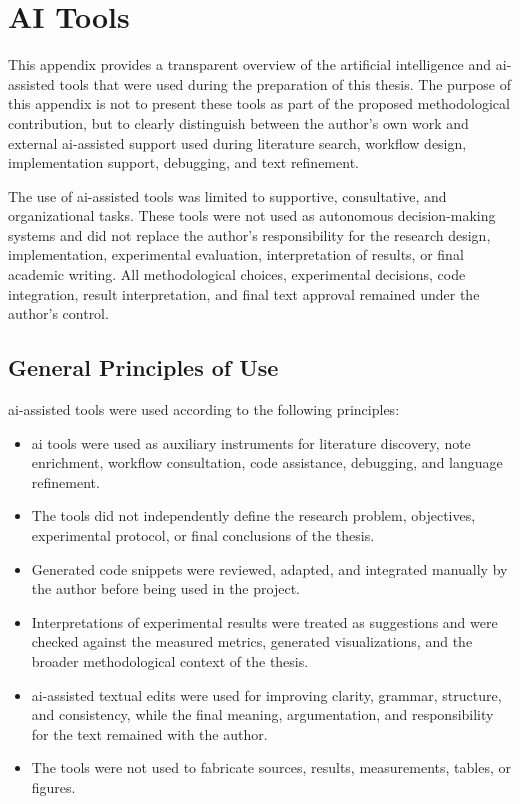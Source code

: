 
\chapter{AI Tools}\label{app:ai_tools}

This appendix provides a transparent overview of the artificial intelligence and \gls{ai}-assisted tools that were used during the preparation of this thesis. The purpose of this appendix is not to present these tools as part of the proposed methodological contribution, but to clearly distinguish between the author's own work and external \gls{ai}-assisted support used during literature search, workflow design, implementation support, debugging, and text refinement.

The use of \gls{ai}-assisted tools was limited to supportive, consultative, and organizational tasks. These tools were not used as autonomous decision-making systems and did not replace the author's responsibility for the research design, implementation, experimental evaluation, interpretation of results, or final academic writing. All methodological choices, experimental decisions, code integration, result interpretation, and final text approval remained under the author's control.

\section{General Principles of Use}

\gls{ai}-assisted tools were used according to the following principles:

\begin{itemize}
    \item \gls{ai} tools were used as auxiliary instruments for literature discovery, note enrichment, workflow consultation, code assistance, debugging, and language refinement.
    \item The tools did not independently define the research problem, objectives, experimental protocol, or final conclusions of the thesis.
    \item Generated code snippets were reviewed, adapted, and integrated manually by the author before being used in the project.
    \item Interpretations of experimental results were treated as suggestions and were checked against the measured metrics, generated visualizations, and the broader methodological context of the thesis.
    \item \gls{ai}-assisted textual edits were used for improving clarity, grammar, structure, and consistency, while the final meaning, argumentation, and responsibility for the text remained with the author.
    \item The tools were not used to fabricate sources, results, measurements, tables, or figures.
\end{itemize}


